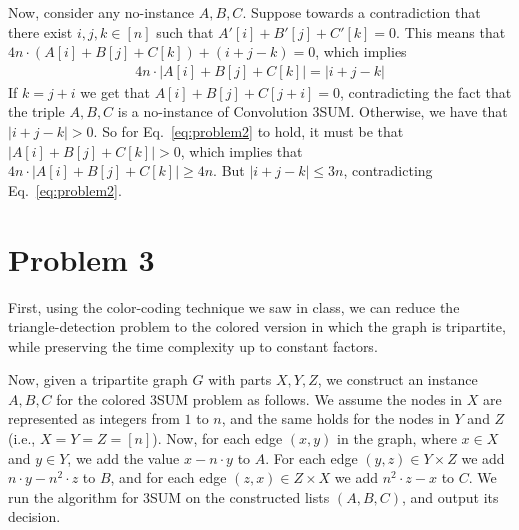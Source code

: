 Now, consider any no-instance $A,B,C$. 
Suppose towards a contradiction that there exist $i,j,k\in [n]$ such that $A'[i] + B'[j] + C'[k] = 0$.
%
This means that $4n\cdot(A[i] + B[j] + C[k]) + (i+j-k) = 0$, which implies
\begin{align}\label{eq:problem2}
    4n\cdot|A[i] + B[j] + C[k]| = |i+j-k|
\end{align}
If $k = j+i$ we get that $A[i] + B[j] + C[j+i] = 0$, contradicting the fact that the triple $A,B,C$ is a no-instance of Convolution 3SUM.
Otherwise, we have that $|i+j-k| > 0$. 
So for Eq.~\eqref{eq:problem2} to hold, it must be that $|A[i] + B[j] + C[k]| > 0$, which implies that $4n\cdot|A[i] + B[j] + C[k]| \geq 4n$.
But $|i+j-k| \leq 3n$, contradicting Eq.~\eqref{eq:problem2}.




\section{Problem 3}

First, using the color-coding technique we saw in class, we can reduce the triangle-detection problem to the colored version in which the graph is tripartite, while preserving the time complexity up to constant factors. 

Now, given a tripartite graph $G$ with parts $X, Y, Z$, we construct an instance $A,B,C$ for the colored 3SUM problem as follows.
We assume the nodes in $X$ are represented as integers from $1$ to $n$, and the same holds for the nodes in $Y$ and $Z$ (i.e., $X=Y=Z=[n]$).
Now, for each edge $(x, y)$ in the graph, where $x\in X$ and $y\in Y$, we add the value $x-n\cdot y$ to $A$. 
For each edge $(y, z) \in Y\times Z$ we add $n\cdot y-n^2\cdot z$ to $B$, and for each edge $(z, x) \in Z\times X$ we add $n^2\cdot z-x$ to $C$. 
We run the algorithm for 3SUM on the constructed lists $(A, B, C)$, and output its decision.

